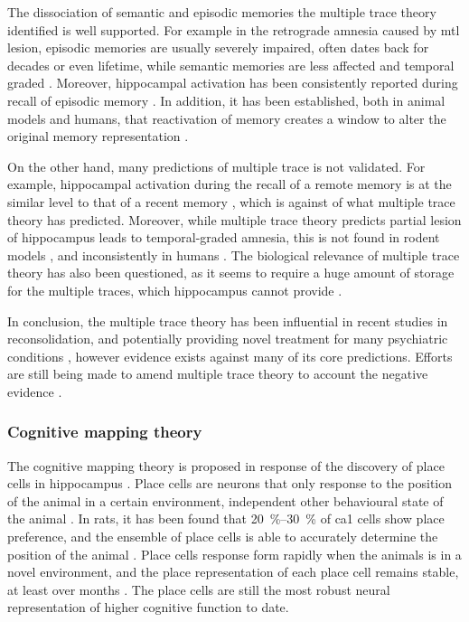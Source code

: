 The dissociation of semantic and episodic memories the multiple trace theory identified is well supported. For example in the retrograde amnesia caused by \gls{mtl} lesion, episodic memories are usually severely impaired, often dates back for decades or even lifetime, while semantic memories are less affected and temporal graded \citep{kapur97, vargha-khadem97, moscovitch05}. Moreover, hippocampal activation has been consistently reported during recall of episodic memory \citep{maguire01, svoboda06}. In addition, it has been established, both in animal models and humans, that reactivation of memory creates a window to alter the original memory representation \citep{wang10, dunbar16}.

On the other hand, many predictions of multiple trace is not validated. For example, hippocampal activation during the recall of a remote memory is at the similar level to that of a recent memory \citep{addis04, steinvorth06, wheeler13}, which is against of what multiple trace theory has predicted. Moreover, while multiple trace theory predicts partial lesion of hippocampus leads to temporal-graded amnesia, this is not found in rodent models \citep{sutherland10}, and inconsistently in humans \citep{yassa13}. The biological relevance of multiple trace theory has also been questioned, as it seems to require a huge amount of storage for the multiple traces, which hippocampus cannot provide \citep{yassa13}. 

In conclusion, the multiple trace theory has been influential in recent studies in reconsolidation, and potentially providing novel treatment for many psychiatric conditions \citep{dunbar16}, however evidence exists against many of its core predictions. Efforts are still being made to amend multiple trace theory to account the negative evidence \citep{moscovitch05, yassa13}.

\subsubsection{Cognitive mapping theory \label{hpc-spatial}}
The cognitive mapping theory is proposed in response of the discovery of place cells in hippocampus \citep{o'keefe71, o'keefe78}. Place cells are neurons that only response to the position of the animal in a certain environment, independent other behavioural state of the animal \citep{o'keefe78}. In rats, it has been found that \SIrange{20}{30}{\percent} of \gls{ca1} cells show place preference, and the ensemble of place cells is able to accurately determine the position of the animal \citep{guzowski99, o'keefe05, ziv13}. Place cells response form rapidly when the animals is in a novel environment, and the place representation of each place cell remains stable, at least over months \citep{wilson93, ziv13}. The place cells are still the most robust neural representation of higher cognitive function to date.

